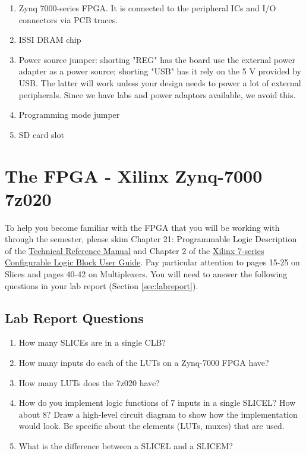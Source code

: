 \documentclass[11pt]{article}
\begin{document}
\begin{enumerate}
  \item Zynq 7000-series FPGA. It is connected to the peripheral ICs and I/O connectors via PCB traces.
  \item ISSI DRAM chip
  \item Power source jumper: shorting "REG" has the board use the external power adapter as a power source; shorting "USB" has it rely on the 5 V provided by USB. The latter will work unless your design needs to power a lot of external peripherals. Since we have labs and power adaptors available, we avoid this.
  \item Programming mode jumper
  \item SD card slot
\end{enumerate}

\section{The FPGA - Xilinx Zynq-7000 7z020}
To help you become familiar with the FPGA that you will be working with through the semester, please skim Chapter 21: Programmable Logic Description of the \href{https://www.xilinx.com/support/documentation/user_guides/ug585-Zynq-7000-TRM.pdf}{Technical Reference Manual} and Chapter 2 of the \href{http://www.xilinx.com/support/documentation/user_guides/ug474_7Series_CLB.pdf}{Xilinx 7-series Configurable Logic Block User Guide}.
Pay particular attention to pages 15-25 on Slices and pages 40-42 on Multiplexers.
You will need to answer the following questions in your lab report (Section \ref{sec:labreport}).

\subsection{Lab Report Questions}\label{sec:checkoffQuestions}
\begin{enumerate}
  \item How many SLICEs are in a single CLB?
  \item How many inputs do each of the LUTs on a Zynq-7000 FPGA have?
  \item How many LUTs does the 7z020 have?
\item How do you implement logic functions of 7 inputs in a single SLICEL? How about 8? Draw a high-level circuit diagram to show how the implementation would look. Be specific about the elements (LUTs, muxes) that are used.
  \item What is the difference between a SLICEL and a SLICEM?
\end{enumerate}
\end{document}
